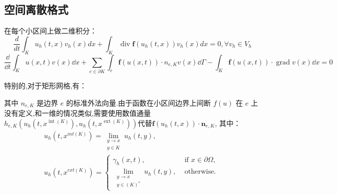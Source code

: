 \documentclass{book}
\begin{document}
\subsection{空间离散格式}
在每个小区间上做二维积分：
\begin{equation}
    \frac{d}{d t} \int_{K} u_{h}(t, x) v_{h}(x) d x+\int_{K} \operatorname{div} \mathbf{f}\left(u_{h}(t, x)\right) v_{h}(x) d x=0, \forall v_{h} \in V_{h}
\end{equation}
\begin{equation}
    \dfrac{\dd}{\dd t} \int_{K} u(x, t) v(x) \dd x+\sum_{e \in \partial K} \int_{e} \mathbf{f}(u(x, t)) \cdot n_{e, K} v(x) \dd \Gamma-\int_{K} \mathbf{f}(u(x, t)) \cdot \operatorname{grad} v(x) \dd x=0
\end{equation}
\begin{remark}
    特别的,对于矩形网格,有：
\end{remark}
其中 $n_{e,K}$ 是边界 $e$ 的标准外法向量.由于函数在小区间边界上间断 $f(u)$ 在 $e$ 上没有定义,和一维的情况类似,需要使用数值通量$h_{e, K}\left(u_{h}\left(t, x^{\operatorname{int}(K)}\right), u_{h}\left(t, x^{\operatorname{ext}(K)}\right)\right)$代替$\mathbf{f}\left(u_{h}(t, x)\right) \cdot \mathbf{n}_{e, K}$, 其中：
\begin{equation}
    \begin{array}{l}
        u_{h}\left(t, x^{i n t(K)}\right)= \lim _{\substack{y \rightarrow x \\
        y \in K}} u_{h}(t, y),                                              \\
        u_{h}\left(t, x^{e x t(K)}\right)=\left\{\begin{array}{ll}
                                                     \gamma_{h}(x, t),           & \text { if } x \in \partial \Omega, \\
                                                     \lim _{\substack{y \rightarrow x                                  \\
                                                     y \in(K)^{c}}} u_{h}(t, y), & \text { otherwise. }
                                                 \end{array}\right.
    \end{array}
\end{equation}

\end{document}
